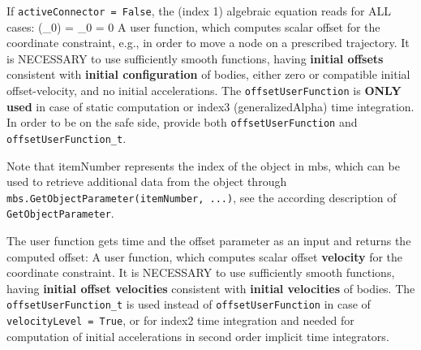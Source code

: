     If \texttt{activeConnector = False}, the (index 1) algebraic equation reads for ALL cases:
    \be
      \cv(\lambda_0) = \lambda_0 = 0
    \ee
    A user function, which computes scalar offset for the coordinate constraint, e.g., in order to move a node on a prescribed trajectory.
    It is NECESSARY to use sufficiently smooth functions, having {\bf initial offsets} consistent with {\bf initial configuration} of bodies, 
    either zero or compatible initial offset-velocity, and no initial accelerations.
    The \texttt{offsetUserFunction} is {\bf ONLY used} in case of static computation or index3 (generalizedAlpha) time integration.
    In order to be on the safe side, provide both  \texttt{offsetUserFunction} and  \texttt{offsetUserFunction\_t}.

    Note that itemNumber represents the index of the object in mbs, which can be used to retrieve additional data from the object through
    \texttt{mbs.GetObjectParameter(itemNumber, ...)}, see the according description of \texttt{GetObjectParameter}.

    The user function gets time and the offset parameter as an input and returns the computed offset:
    \finishTable
%
    A user function, which computes scalar offset {\bf velocity} for the coordinate constraint.
    It is NECESSARY to use sufficiently smooth functions, having {\bf initial offset velocities} consistent with {\bf initial velocities} of bodies.
    The \texttt{offsetUserFunction\_t} is used instead of \texttt{offsetUserFunction} in case of \texttt{velocityLevel = True}, 
    or for index2 time integration and needed for computation of initial accelerations in second order implicit time integrators.

